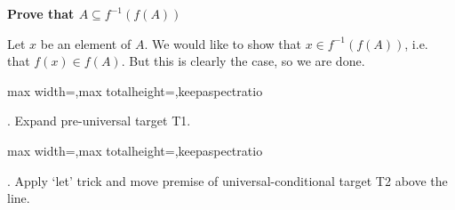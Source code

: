 \documentclass[a4paper,twoside,12pt]{article} %
\makeatletter
\DeclareRobustCommand{\_}{%
  \leavevmode\vbox{%
    \hrule\@width.4em
          \@height-.16ex
          \@depth\dimexpr.16ex+.28pt\relax}}
\newcommand\Tstrut{\rule{0pt}{2.4ex}}
\newcommand\Bstrut{\rule[-1.1ex]{0pt}{0pt}}
\newenvironment{fit}{\begin{adjustbox}{max width=\textwidth,max totalheight=\textheight,keepaspectratio}}{\end{adjustbox}}
\makeatother
\begin{document}
{\begin{center} \large \textbf{Prove that $A \subseteq f^{-1}(f(A))$}\end{center}}\nopagebreak[4]

\begin{center}
\begin{minipage}{120mm}
Let $x$ be an element of $A$. We would like to show that $x\in f^{-1}(f(A))$, i.e. that $f(x)\in f(A)$. But this is clearly the case, so we are done.
\end{minipage}
\end{center}

\bigskip
\begin{steps}
\begin{fit}%
\end{fit}
\smallskip

. Expand pre-universal target T1.\nopagebreak[4] 
\marginpar{}\nopagebreak[4] 
\smallskip\nopagebreak[4] 

\begin{fit}%
\end{fit}
\smallskip

. Apply `let' trick and move premise of universal-conditional target T2 above the line.\nopagebreak[4] 
\nopagebreak[4] 
\smallskip\nopagebreak[4] 


\end{steps}
\end{document}
